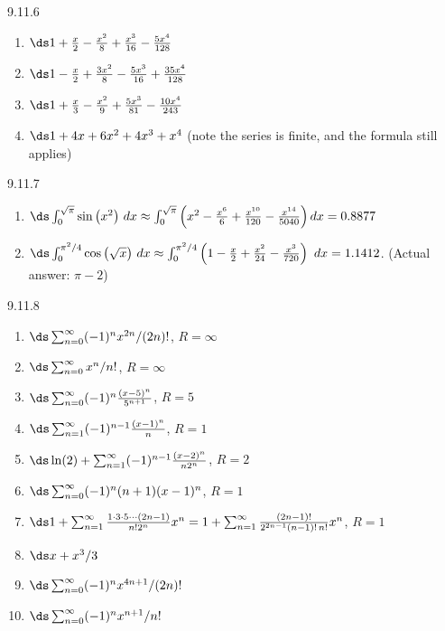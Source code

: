 \begin{Answer}{9.11.6}
\begin{enumerate}
\item
{$\ds 1+\frac x2-\frac{x^2}{8}+\frac{x^3}{16}-\frac{5x^4}{128}$
}
\item
{$\ds 1-\frac x2+\frac{3x^2}{8}-\frac{5x^3}{16}+\frac{35x^4}{128}$
}
\item
{$\ds 1+\frac x3-\frac{x^2}{9}+\frac{5x^3}{81}-\frac{10x^4}{243}$
}
\item
{$\ds 1+4x+6x^2+4x^3+x^4$ (note the series is finite, and the formula still applies)
}
\end{enumerate}
\end{Answer}
\begin{Answer}{9.11.7}
\begin{enumerate}
\item
{$\ds \int_0^{\sqrt{\pi}} \sin \big(x^2\big)\ dx \approx \int_0^{\sqrt{\pi}} \left(x^2-\frac{x^6}6+\frac{x^{10}}{120}-\frac{x^{14}}{5040}\right) dx = 0.8877$
}
\item
{$\ds \int_0^{\pi^2/4} \cos \big(\sqrt{x}\big)\ dx \approx \int_0^{\pi^2/4} \left(1-\frac x2+\frac{x^2}{24}-\frac{x^3}{720}\right)\ dx = 1.1412$. (Actual answer: $\pi-2$)
}
\end{enumerate}
\end{Answer}
\begin{Answer}{9.11.8}
\begin{enumerate}
	\item $\ds\sum_{n=0}^\infty (-1)^n x^{2n}/(2n)!$, $R=\infty$
	\item $\ds\sum_{n=0}^\infty x^n/n!$, $R=\infty$
	\item $\ds\sum_{n=0}^\infty (-1)^n{(x-5)^n\over 5^{n+1}}$, $R=5$
	\item $\ds\sum_{n=1}^\infty (-1)^{n-1}{(x-1)^n\over n}$, $R=1$
	\item $\ds\ln(2)+\sum_{n=1}^\infty (-1)^{n-1}{(x-2)^n\over n 2^n}$, $R=2$
	\item $\ds\sum_{n=0}^\infty (-1)^n(n+1)(x-1)^n$, $R=1$
	\item $\ds1+\sum_{n=1}^\infty {1\cdot3\cdot5\cdots(2n-1)\over
		n!2^n} x^n=1+\sum_{n=1}^\infty {(2n-1)!\over 2^{2n-1}(n-1)!\,n!}x^n$, $R=1$
	\item $\ds x+x^3/3$
	\item $\ds\sum_{n=0}^\infty (-1)^n x^{4n+1}/(2n)!$
	\item $\ds\sum_{n=0}^\infty (-1)^n x^{n+1}/n!$
\end{enumerate}
\end{Answer}
